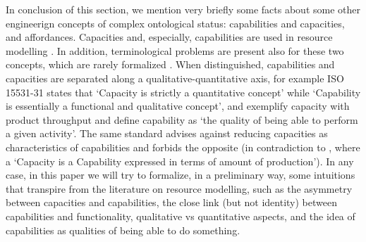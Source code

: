 \documentclass[sw]{iosart2x}
\newcommand{\quotes}[1]{`#1'}
\begin{document}
\medskip
In conclusion of this section, we mention very briefly some facts about some other engineerign concepts of complex ontological status: capabilities and capacities, and affordances. 
Capacities and, especially, capabilities are used in resource modelling \cite{jarvenpaaDevelopmentOntologyDescribing2019a, sarkarOntologyModelProcess2019, jochemISOISO15531312004, solanoKnowledgeRepresentationProduct2014}. In addition, terminological problems are present also for these two concepts, which are rarely formalized \cite{sanfilippoResourcesManufacturing2015, borgoCapabilitiesCapacitiesFunctionalities2021}. When distinguished, capabilities and capacities are separated along a qualitative-quantitative axis, for example ISO 15531-31\cite{jochemISOISO15531312004} states that \quotes{Capacity is strictly a quantitative concept} while \quotes{Capability is essentially a functional and qualitative concept}, and exemplify capacity with product throughput and define capability as \quotes{the quality of being able to perform a given activity}. The same standard advises against reducing capacities as characteristics of capabilities and forbids the opposite (in contradiction to \cite{solanoKnowledgeRepresentationProduct2014}, where a \quotes{Capacity is a Capability
expressed in terms of amount of production}).
In any case, in this paper we will try to formalize, in a preliminary way, some intuitions that transpire from the literature on resource modelling, such as the asymmetry between capacities and capabilities, the close link (but not identity) between capabilities and functionality, qualitative vs quantitative aspects, and the idea of capabilities as qualities of being able to do something.
\end{document}
